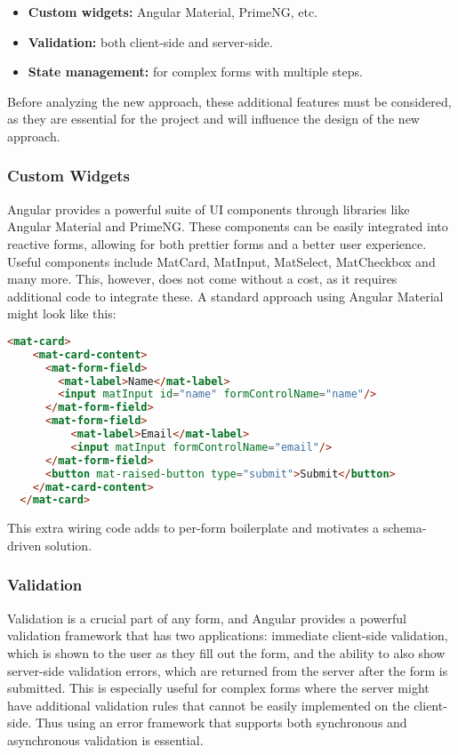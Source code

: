 \begin{itemize}
  \item \textbf{Custom widgets:} Angular Material, PrimeNG, etc.
  \item \textbf{Validation:} both client-side and server-side.
  \item \textbf{State management:} for complex forms with multiple steps.
\end{itemize}

Before analyzing the new approach, these additional features must be considered, as they are essential for the
project and will influence the design of the new approach.

\subsubsection{Custom Widgets}

Angular provides a powerful suite of UI components through libraries like Angular Material and PrimeNG\@.
These components can be easily integrated into reactive forms, allowing for both prettier forms and a better user
experience.
Useful components include MatCard, MatInput, MatSelect, MatCheckbox and many more.
This, however, does not come without a cost, as it requires additional code to integrate these.
A standard approach using Angular Material might look like this:

\begin{lstlisting}[language=HTML,caption={Angular Material HTML}, label={lst:materialHTML}]
  <mat-card>
    <mat-card-content>
      <mat-form-field>
        <mat-label>Name</mat-label>
        <input matInput id="name" formControlName="name"/>
      </mat-form-field>
      <mat-form-field>
          <mat-label>Email</mat-label>
          <input matInput formControlName="email"/>
      </mat-form-field>
      <button mat-raised-button type="submit">Submit</button>
    </mat-card-content>
  </mat-card>
\end{lstlisting}

This extra wiring code adds to per-form boilerplate and motivates a schema-driven solution.

\subsubsection{Validation}

Validation is a crucial part of any form, and Angular provides a powerful validation framework that has two applications:
immediate client-side validation, which is shown to the user as they fill out the form, and the ability to also show
server-side validation errors, which are returned from the server after the form is submitted.
This is especially useful for complex forms where the server might have additional validation rules that cannot be easily
implemented on the client-side.
Thus using an error framework that supports both synchronous and asynchronous validation is essential.

